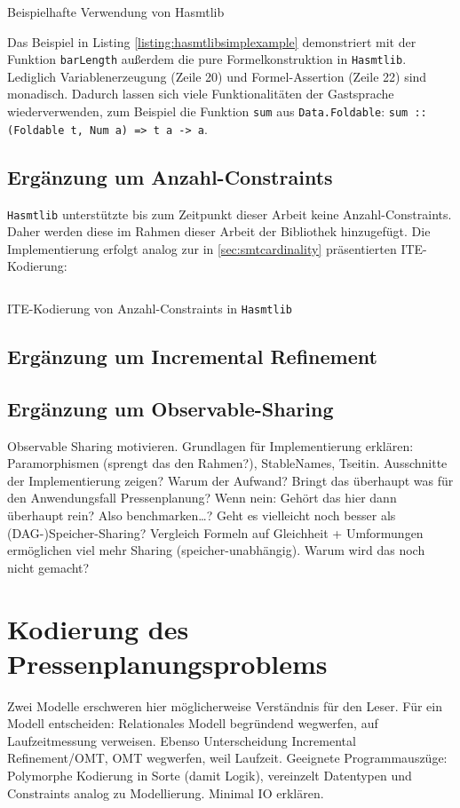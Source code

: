 \begin{listing}[H]
    \inputminted[linenos=true]{haskell}{Code/Implementierung/Hasmtlib/BeispielSimple.hs}
    \caption{Beispielhafte Verwendung von Hasmtlib}
    \label{listing:hasmtlibsimplexample}
\end{listing}

Das Beispiel in Listing \ref{listing:hasmtlibsimplexample} demonstriert mit der Funktion \texttt{barLength} außerdem die pure Formelkonstruktion in \texttt{Hasmtlib}.
Lediglich Variablenerzeugung (Zeile 20) und Formel-Assertion (Zeile 22) sind monadisch.
Dadurch lassen sich viele Funktionalitäten der Gastsprache wiederverwenden, zum Beispiel die Funktion \texttt{sum} aus \texttt{Data.Foldable}:
\texttt{sum :: (Foldable t, Num a) => t a -> a}.

\subsection{Ergänzung um Anzahl-Constraints}
\texttt{Hasmtlib} unterstützte bis zum Zeitpunkt dieser Arbeit keine Anzahl-Constraints.
Daher werden diese im Rahmen dieser Arbeit der Bibliothek hinzugefügt.
Die Implementierung erfolgt analog zur in \ref{sec:smtcardinality} präsentierten ITE-Kodierung:

\begin{listing}[H]
    \inputminted[linenos=true]{haskell}{Code/Implementierung/Hasmtlib/Cardinality.hs}
    \caption{ITE-Kodierung von Anzahl-Constraints in \texttt{Hasmtlib} \cite{hasmtlibCardinality}}
    \label{listing:hasmtlibcardinality}
\end{listing}

\subsection{Ergänzung um Incremental Refinement}

\subsection{Ergänzung um Observable-Sharing}
Observable Sharing motivieren.
Grundlagen für Implementierung erklären: Paramorphismen (sprengt das den Rahmen?), StableNames, Tseitin.
Ausschnitte der Implementierung zeigen?
Warum der Aufwand?
Bringt das überhaupt was für den Anwendungsfall Pressenplanung?
Wenn nein: Gehört das hier dann überhaupt rein?
Also benchmarken\ldots?
Geht es vielleicht noch besser als (DAG-)Speicher-Sharing?
Vergleich Formeln auf Gleichheit + Umformungen ermöglichen viel mehr Sharing (speicher-unabhängig).
Warum wird das noch nicht gemacht?

\section{Kodierung des Pressenplanungsproblems}
Zwei Modelle erschweren hier möglicherweise Verständnis für den Leser.
Für ein Modell entscheiden: Relationales Modell begründend wegwerfen, auf Laufzeitmessung verweisen.
Ebenso Unterscheidung Incremental Refinement/OMT, OMT wegwerfen, weil Laufzeit.
Geeignete Programmauszüge: Polymorphe Kodierung in Sorte (damit Logik), vereinzelt Datentypen und Constraints analog zu Modellierung.
Minimal IO erklären.
